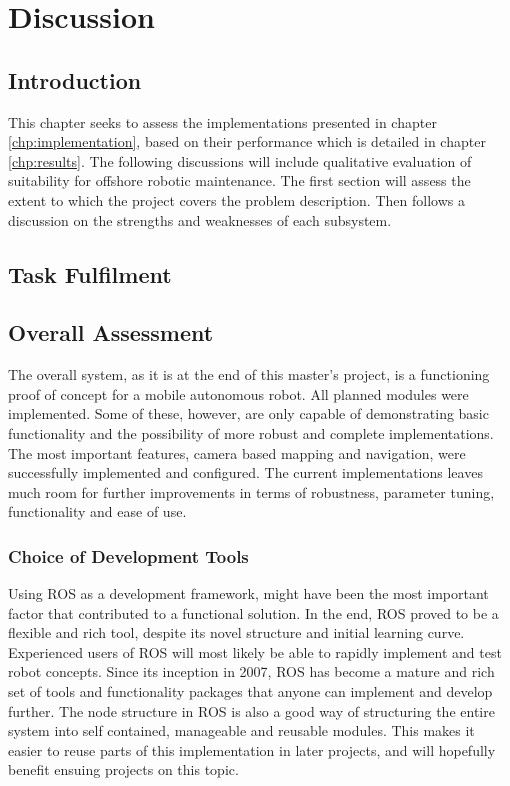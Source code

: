 \chapter{Discussion}
\label{chp:discussion} 

\section{Introduction}

This chapter seeks to assess the implementations presented in chapter \ref{chp:implementation}, based on their performance which is detailed in chapter \ref{chp:results}. The following discussions will include qualitative evaluation of suitability for offshore robotic maintenance. The first section will assess the extent to which the project covers the problem description. Then follows a discussion on the strengths and weaknesses of each subsystem.


\section{Task Fulfilment}



\section{Overall Assessment}

The overall system, as it is at the end of this master's project, is a functioning proof of concept for a mobile autonomous robot. All planned modules were implemented. Some of these, however, are only capable of demonstrating basic functionality and the possibility of more robust and complete implementations. The most important features, camera based mapping and navigation, were successfully implemented and configured. The current implementations leaves much room for further improvements in terms of robustness, parameter tuning, functionality and ease of use.

\subsection{Choice of Development Tools}

Using \ac{ROS} as a development framework, might have been the most important factor that contributed to a functional solution. In the end, \ac{ROS} proved to be a flexible and rich tool, despite its novel structure and initial learning curve. Experienced users of \ac{ROS} will most likely be able to rapidly implement and test robot concepts.  Since its inception in 2007, \ac{ROS} has become a mature and rich set of tools and functionality packages that anyone can implement and develop further. The node structure in \ac{ROS} is also a good way of structuring the entire system into self contained, manageable and reusable modules. This makes it easier to reuse parts of this implementation in later projects, and will hopefully benefit ensuing projects on this topic.

